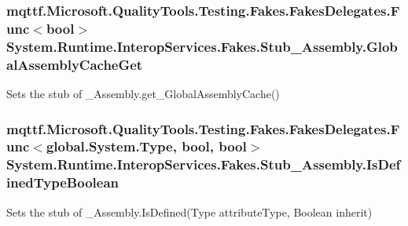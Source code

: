 \hypertarget{class_system_1_1_runtime_1_1_interop_services_1_1_fakes_1_1_stub___assembly_aaa30127a2af9552ec104fdfe1cefc403}{
\subsubsection[{Global\-Assembly\-Cache\-Get}]{\setlength{\rightskip}{0pt plus 5cm}mqttf.\-Microsoft.\-Quality\-Tools.\-Testing.\-Fakes.\-Fakes\-Delegates.\-Func$<$bool$>$ System.\-Runtime.\-Interop\-Services.\-Fakes.\-Stub\-\_\-\-Assembly.\-Global\-Assembly\-Cache\-Get}}\label{class_system_1_1_runtime_1_1_interop_services_1_1_fakes_1_1_stub___assembly_aaa30127a2af9552ec104fdfe1cefc403}


Sets the stub of \-\_\-\-Assembly.\-get\-\_\-\-Global\-Assembly\-Cache()

\hypertarget{class_system_1_1_runtime_1_1_interop_services_1_1_fakes_1_1_stub___assembly_a9fc84fc5acc362a00a740788f59ecf5d}{
\subsubsection[{Is\-Defined\-Type\-Boolean}]{\setlength{\rightskip}{0pt plus 5cm}mqttf.\-Microsoft.\-Quality\-Tools.\-Testing.\-Fakes.\-Fakes\-Delegates.\-Func$<$global.\-System.\-Type, bool, bool$>$ System.\-Runtime.\-Interop\-Services.\-Fakes.\-Stub\-\_\-\-Assembly.\-Is\-Defined\-Type\-Boolean}}\label{class_system_1_1_runtime_1_1_interop_services_1_1_fakes_1_1_stub___assembly_a9fc84fc5acc362a00a740788f59ecf5d}


Sets the stub of \-\_\-\-Assembly.\-Is\-Defined(\-Type attribute\-Type, Boolean inherit)

